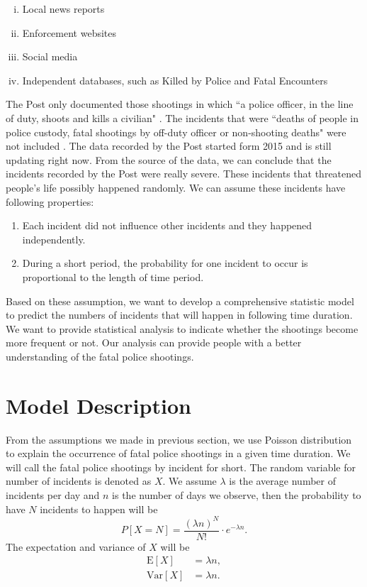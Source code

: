 \documentclass[11pt,a4paper,english]{article}
\begin{document}
\begin{enumerate}[(i)]
    \item Local news reports
    \item Enforcement websites
    \item Social media
	\item Independent databases, such as Killed by Police and Fatal Encounters
\end{enumerate}

The Post only documented those shootings in which ``a police officer, in the line of duty, shoots and kills a civilian" \cite{post}. The incidents that were ``deaths of people in police custody, fatal shootings by off-duty officer or non-shooting deaths" were not included \cite{post}. The data recorded by the Post started form 2015 and is still updating right now. From the source of the data, we can conclude that the incidents recorded by the Post were really severe. These incidents that threatened people's life possibly happened randomly. We can assume these incidents have following properties:
\begin{enumerate}
    \item Each incident did not influence other incidents and they happened independently.
    \item During a short period, the probability for one incident to occur is proportional to the length of time period. 
\end{enumerate}
Based on these assumption, we want to develop a comprehensive statistic model to predict the numbers of incidents that will happen in following time duration. We want to provide statistical analysis to indicate whether the shootings become more frequent or not. Our analysis can provide people with a better understanding of the fatal police shootings.
\section{Model Description}
From the assumptions we made in previous section, we use Poisson distribution to explain the occurrence of fatal police shootings in a given time duration. 
We will call the fatal police shootings by incident for short. 
The random variable for number of incidents is denoted as $X$. 
We assume $\lambda$ is the average number of incidents per day and $n$ is the number of days we observe, then the probability to have $N$ incidents to happen will be 
\begin{equation*}
	P[X = N] = \frac{(\lambda n)^{N}}{N!} \cdot e^{-\lambda n}.
\end{equation*}
The expectation and variance of $X$ will be
\begin{align*}
	\text{E}[X] &= \lambda n, \\
	\text{Var}[X] &= \lambda n.
\end{align*}
\end{document}
